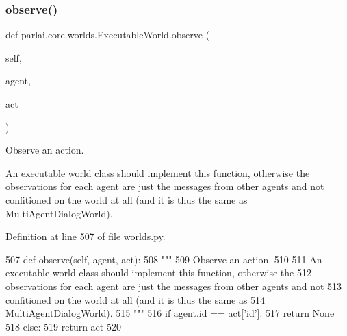 \subsubsection{\texorpdfstring{observe()}{observe()}}
{\footnotesize\ttfamily def parlai.\+core.\+worlds.\+Executable\+World.\+observe (\begin{DoxyParamCaption}\item[{}]{self,  }\item[{}]{agent,  }\item[{}]{act }\end{DoxyParamCaption})}

\begin{DoxyVerb}Observe an action.

An executable world class should implement this function, otherwise the
observations for each agent are just the messages from other agents and not
confitioned on the world at all (and it is thus the same as
MultiAgentDialogWorld).
\end{DoxyVerb}
 

Definition at line 507 of file worlds.\+py.


\begin{DoxyCode}
507     \textcolor{keyword}{def }observe(self, agent, act):
508         \textcolor{stringliteral}{"""}
509 \textcolor{stringliteral}{        Observe an action.}
510 \textcolor{stringliteral}{}
511 \textcolor{stringliteral}{        An executable world class should implement this function, otherwise the}
512 \textcolor{stringliteral}{        observations for each agent are just the messages from other agents and not}
513 \textcolor{stringliteral}{        confitioned on the world at all (and it is thus the same as}
514 \textcolor{stringliteral}{        MultiAgentDialogWorld).}
515 \textcolor{stringliteral}{        """}
516         \textcolor{keywordflow}{if} agent.id == act[\textcolor{stringliteral}{'id'}]:
517             \textcolor{keywordflow}{return} \textcolor{keywordtype}{None}
518         \textcolor{keywordflow}{else}:
519             \textcolor{keywordflow}{return} act
520 
\end{DoxyCode}
\mbox{\label{classparlai_1_1core_1_1worlds_1_1ExecutableWorld_a6555592d2b7c316e72febc1fccf43bdb}} 
